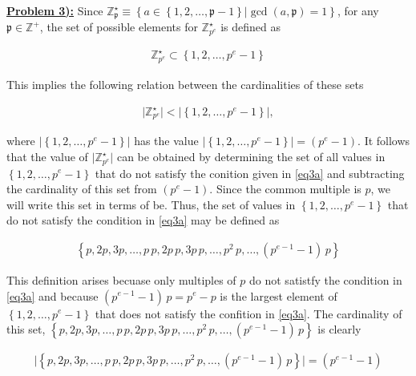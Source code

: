 \documentclass{article}[12]
\numberwithin{equation}{section}
\newcommand{\numbpr}[1]{\setcounter{section}{#1} \setcounter{equation}{0}}
\newcommand{\prob}[1]{\textbf{\underline{Problem #1):}}}
\newcommand{\Z}{\mathbb{Z}}
\begin{document}
\begin{flushleft}
\vspace{0.35 in}



\numbpr{3}
\prob{3}  Since $\Z_\mathfrak{p}^\star \equiv \left\{ a \in \left\{ 1, 2, \dots, \mathfrak{p}-1 \right\} \vert \gcd \left(a, \mathfrak{p}\right) = 1 \right\}$, for any $\mathfrak{p} \in \Z^+$, the set of possible elements for $\Z_{p^e}^\star$ is defined as

\begin{align}
  \Z_{p^e}^\star \subset \left\{ 1, 2, \dots, p^e - 1 \right\} \label{eq3a}
\end{align}

This implies the following relation between the cardinalities of these sets

\begin{align*}
  \lvert \Z_{p^e}^\star \rvert < \lvert \left\{ 1, 2, \dots, p^e - 1 \right\} \rvert,
\end{align*}

where $\lvert \left\{ 1, 2, \dots, p^e - 1 \right\} \rvert$ has the value $\lvert \left\{ 1, 2, \dots, p^e - 1 \right\} \rvert = \left(p^e - 1\right)$.  It follows that the value of $\lvert \Z_{p^e}^\star \rvert$ can be obtained by determining the set of all values in $\left\{ 1, 2, \dots, p^e - 1 \right\}$ that do not satisfy the conition given in \ref{eq3a} and subtracting the cardinality of this set from $\left( p^e - 1 \right)$.  Since the common multiple is $p$, we will write this set in terms of be.  Thus, the set of values in $\left\{ 1, 2, \dots, p^e - 1 \right\}$ that do not satisfy the condition in \ref{eq3a} may be defined as 

\begin{align*}
  \left\{ p, 2p, 3p, \dots, p \, p, 2 p \, p, 3 p \, p, \dots, p^2 \, p, \dots, \left(p^{e-1} - 1\right) \, p \right\}
\end{align*}

This definition arises becuase only multiples of $p$ do not satistfy the condition in \ref{eq3a} and because $\left(p^{e-1} - 1\right) \, p = p^e - p$ is the largest element of $\left\{ 1, 2, \dots, p^e - 1 \right\}$ that does not satisfy the confition in \ref{eq3a}.  The cardinality of this set, $\left\{ p, 2p, 3p, \dots, p \, p, 2 p \, p, 3 p \, p, \dots, p^2 \, p, \dots, \left(p^{e-1} - 1\right) \, p \right\}$ is clearly

\begin{align*}
  \lvert \left\{ p, 2p, 3p, \dots, p \, p, 2 p \, p, 3 p \, p, \dots, p^2 \, p, \dots, \left(p^{e-1} - 1\right) \, p \right\} \rvert = \left(p^{e-1} - 1\right)
\end{align*}


\end{flushleft}
\end{document}
